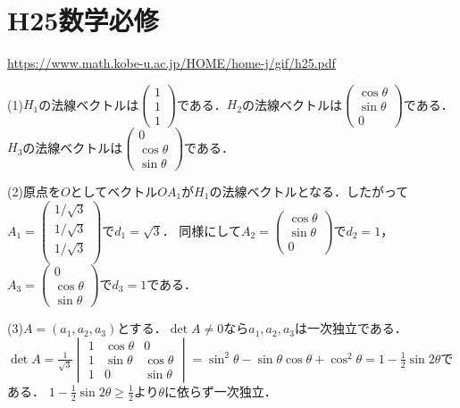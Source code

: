 \documentclass[
		book,
		head_space=20mm,
		foot_space=20mm,
		gutter=10mm,
		line_length=190mm
]{jlreq}
\begin{document}
\section{H25数学必修}
\url{https://www.math.kobe-u.ac.jp/HOME/home-j/gif/h25.pdf}

(1)$H_1$の法線ベクトルは$\begin{pmatrix}
    1\\1\\1
\end{pmatrix}$である．$H_2$の法線ベクトルは$\begin{pmatrix}
    \cos \theta\\\sin \theta \\0
\end{pmatrix}$である．$H_3$の法線ベクトルは$\begin{pmatrix}
    0\\\cos \theta\\\sin\theta
\end{pmatrix}$である．

(2)原点を$O$としてベクトル$OA_1$が$H_1$の法線ベクトルとなる．したがって$A_1=\begin{pmatrix}
    1/\sqrt{3}\\1/\sqrt{3}\\1/\sqrt{3}\\
\end{pmatrix}$で$d_1=\sqrt{3}$．
同様にして$A_2=\begin{pmatrix}
    \cos \theta\\\sin \theta \\0
\end{pmatrix}$で$d_2=1$，$A_3=\begin{pmatrix}
    0\\\cos \theta\\\sin\theta
\end{pmatrix}$で$d_3=1$である．

(3)$A=(a_1,a_2,a_3)$とする．$\det A\neq 0$なら$a_1,a_2,a_3$は一次独立である．
$\det A =\frac{1}{\sqrt{3}}\begin{vmatrix}
    1 & \cos\theta & 0\\
    1 & \sin \theta & \cos \theta \\
    1 & 0 & \sin \theta
\end{vmatrix}=\sin^2\theta-\sin\theta \cos \theta+\cos^2\theta=1-\frac{1}{2}\sin 2\theta$である．
$1-\frac{1}{2}\sin 2\theta\ge\frac{1}{2}$より$\theta$に依らず一次独立．
\end{document}
